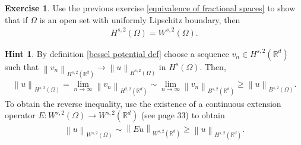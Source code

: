 \documentclass[
    a4paper,
    DIV=14,
    abstract=true,
    numbers=noenddot
]
{scrartcl}
\theoremstyle{definition}
\newtheorem{exercise}{Exercise}
\newtheorem*{hint}{Hint}
\renewcommand{\norm}[1]{\left\lVert #1 \right\rVert}\renewcommand{\abs}[1]{\left| #1 \right|}
\newcommand{\R}{\mathbb{R}}
\begin{document}
\begin{exercise}
  Use the previous exercise \ref{equivalence of fractional spaces} to show that if $\Omega $ is an open set with uniformly Lipschitz boundary, then
  \begin{align*}
    H^{s,2}(\Omega )=W^{s,2}(\Omega ).
  \end{align*}
\end{exercise}
\begin{hint}
  By definition \ref{bessel potential def} choose a sequence $v_n \in H^{s,2}(\R^d)$ such that $\norm{v_n}_{H^{s,2}(\R^d)} \to \norm{u}_{H^{s,2}(\Omega )}$ in $H^s(\Omega )$. Then,
  \begin{align*}
    \norm{u}_{H^{s,2}(\Omega)}= \lim_{n\to\infty}\norm{v_n}_{H^{2,2}(\R^d)}\sim \lim_{n\to\infty}\norm{v_n}_{B^{s,2}(\R^d)}\geq \norm{u}_{B^{s,2}(\Omega )}.
  \end{align*}
  To obtain the reverse inequality, use the existence of a continuous extension operator $E: W^{s,2}(\Omega )\to W^{s,2}(\R^d)$ (see \cite{di2012hitchhiker's} page 33) to obtain
  \begin{align*}
    \norm{u}_{W^{s,2}(\Omega )}\sim \norm{Eu}_{W^{s,2}(\R^d)}\geq \norm{u}_{H^{s,2}(\R^d)}.
  \end{align*}

\end{hint}
\end{document}
